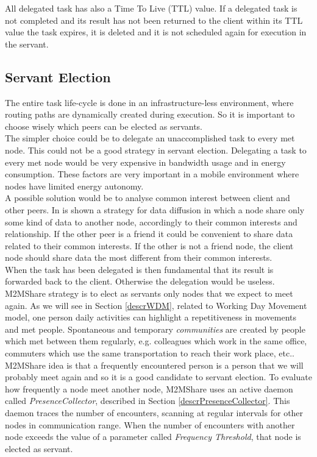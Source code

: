 All delegated task has also a Time To Live (TTL) value. If a delegated task is not completed and its result has not been returned to the client within its TTL value the task expires, it is deleted and it is not scheduled again for execution in the servant.
\\

\subsection{Servant Election}
The entire task life-cycle is done in an infrastructure-less environment, where routing paths are dynamically created during execution. So it is important to choose wisely which peers can be elected as servants.
\\

The simpler choice could be to delegate an unaccomplished task to every met node. This could not be a good strategy in servant election. Delegating a task to every met node would be very expensive in bandwidth usage and in energy consumption. These factors are very important in a mobile environment where nodes have limited energy autonomy. 
\\

A possible solution would be to analyse common interest between client and other peers. In \cite{socialNetworks} is shown a strategy for data diffusion in which a node share only some kind of data to another node, accordingly to their common interests and relationship. If the other peer is a friend it could be convenient to share data related to their common interests. If the other is not a friend node, the client node should share data the most different from their common interests.
\\

When the task has been delegated is then fundamental that its result is forwarded back to the client. Otherwise the delegation would be useless. M2MShare strategy is to elect as servants only nodes that we expect to meet again. As we will see in Section \ref{descrWDM}, related to Working Day Movement model, one person daily activities can highlight a repetitiveness in movements and met people. Spontaneous and temporary \textit{communities} are created by people which met between them regularly, e.g. colleagues which work in the same office, commuters which use the same transportation to reach their work place, etc..
\\

M2MShare idea is that a frequently encountered person is a person that we will probably meet again and so it is a good candidate to servant election. To evaluate how frequently a node meet another node, M2MShare uses an active daemon called \textit{PresenceCollector}, described in Section \ref{descrPresenceCollector}. This daemon traces the number of encounters, scanning at regular intervals for other nodes in communication range. When the number of encounters with another node exceeds the value of a parameter called \textit{Frequency Threshold}, that node is elected as servant.
\\


